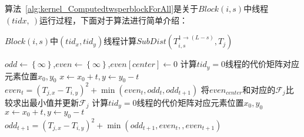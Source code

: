 算法~\ref{alg:kernel_ComputedtwsperblockForAll}是关于$Block(i,s)$中线程$(tidx,~)$运行过程，下面对于算法进行简单介绍：

\begin{breakablealgorithm}
	\caption{$Block(i,s)$中$(tid_x,tid_y)$线程计算$SubDist(T_{i,s}^{1\to (L-s)},T_j)$}
	\label{alg:kernel_ComputedtwsperblockForAll}
	\begin{algorithmic}[1]
			 \label{code:DTWCoalesced}
					\State $odd \gets \left\lbrace \infty\right\rbrace$,$even \gets \left\lbrace \infty\right\rbrace$,$even[center] \gets 0$
					 \label{code:DTWParallel}
						\State 计算$tid_y=0$线程的代价矩阵对应元素位置$x_0,y_0$
						 \label{code:dtwparallelequst}
							\State $x \gets x_0 + t, y \gets y_0 - t$
							 \label{code:prunedtwZone}
								\State $even_t = (T_{j,x}-T_{i,y})^2 +\min(even_t,odd_t,odd_{t+1})$
							\EndIf
						\EndFor
						\State 将$even_{center}$和对应的$\mathcal{F}_j$比较求出最小值并更新$\mathcal{F}_j$ \label{code:dtwcompare0toL}
						\State 计算$tid_y=0$线程的代价矩阵对应元素位置$x_0,y_0$
							\State $x \gets x_0 + t, y \gets y_0 - t$
								\State $odd_{t+1}=(T_{j,x}-T_{i,y})^2 +\min(odd_{t+1},even_t,,even_{t+1})$
							\EndIf
						\EndFor  \label{code:dtwparallelequed}
					\EndFor
				\EndFor
			\EndFor
		\EndFunction
	\end{algorithmic}
\end{breakablealgorithm}

